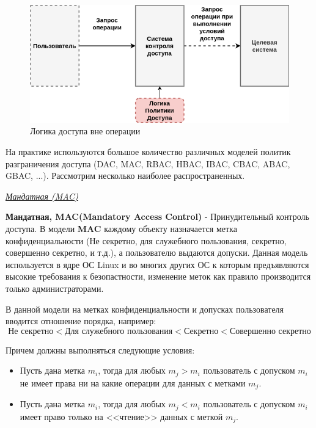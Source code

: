 \begin{figure}[H]
	\centering
	\includegraphics[scale = 0.7]{25/AC_out.png}
	\caption{Логика доступа вне операции}
	\label{fig:ac_out}
\end{figure}

На практике используются большое количество различных моделей политик разграничения доступа (DAC, MAC, RBAC, HBAC, IBAC, CBAC, ABAC, GBAC, ...). Рассмотрим несколько наиболее распространенных.

\begin{center}
	\textit{\underline{Мандатная (MAC)}}
\end{center}

\textbf{Мандатная, MAC(Mandatory Access Control)} - Принудительный контроль доступа. В модели \textbf{MAC} каждому объекту назначается метка конфиденциальности (Не секретно, для служебного пользования, секретно, совершенно секретно, и т.д.), а пользователю выдаются допуски. Данная модель используется в ядре ОС Linux и во многих других ОС к которым предъявляются высокие требования к безопастности, изменение меток как правило производится только администраторами. 

В данной модели на метках конфиденциальности и допусках пользователя вводится отношение порядка, например: $$\text{Не секретно} < \text {Для служебного пользования} < \text{Секретно} < \text {Совершенно секретно}$$

Причем должны выполняться следующие условия:
\begin{itemize}
	\item Пусть дана метка $m_i$, тогда для любых $m_j > m_i$ пользователь с допуском $m_i$ не имеет права ни на какие операции для данных с метками $m_j$.
	\item Пусть дана метка $m_i$, тогда для любых $m_j < m_i$ пользователь с допуском $m_i$ имеет право только на <<чтение>> данных с меткой $m_j$.
\end{itemize}

